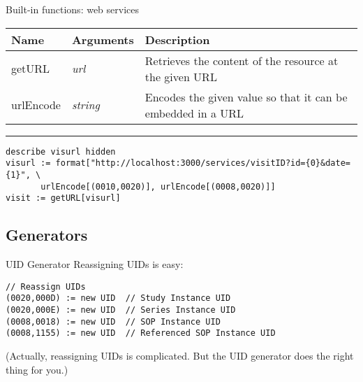\documentclass[handout]{beamer}
\begin{document}
\begin{frame}[fragile]{Built-in functions: web services}
\begin{center}
\small
\begin{tabular}{ l p{1in} p{2in} }
Name & Arguments & Description \\ \hline

getURL & {\em url} &
Retrieves the content of the resource at the given URL \\

\pause
urlEncode & {\em string} &
Encodes the given value so that it can be embedded in a URL \\

\end{tabular}
\end{center}

\pause
\hrule
\scriptsize
\begin{verbatim}
describe visurl hidden
visurl := format["http://localhost:3000/services/visitID?id={0}&date={1}", \
       urlEncode[(0010,0020)], urlEncode[(0008,0020)]]
visit := getURL[visurl]
\end{verbatim}

\end{frame}

\subsection{Generators}
\begin{frame}[fragile]{UID Generator}
Reassigning UIDs is easy:
\begin{verbatim}
// Reassign UIDs
(0020,000D) := new UID	// Study Instance UID
(0020,000E) := new UID	// Series Instance UID
(0008,0018) := new UID	// SOP Instance UID
(0008,1155) := new UID	// Referenced SOP Instance UID
\end{verbatim}
(Actually, reassigning UIDs is complicated. But the UID generator does
the right thing for you.)
\end{frame}
\end{document}
